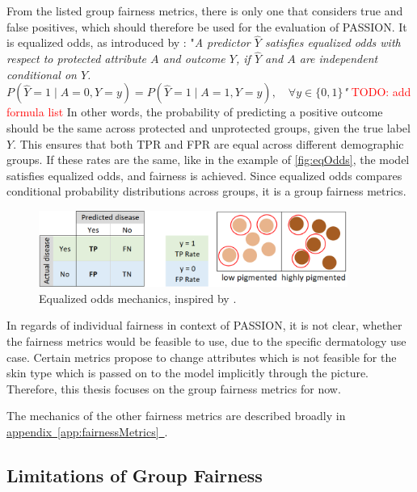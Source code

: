 \documentclass[12pt, a4paper, oneside]{book}   	%
\renewcommand{\todo}[1]{\textcolor{red}{TODO: #1}}
\newcommand{\linkapp}[1]{\hyperref[#1]{appendix~\ref{#1}~\nameref{#1}}}
\begin{document}
		From the listed group fairness metrics, there is only one that considers true and false positives, which should therefore be used for the evaluation of PASSION. It is equalized odds, as introduced by \textcite{M63_Hardt_2016}: \newline
		"\textit{A predictor $\hat{Y}$ satisfies equalized odds with respect to protected attribute $A$ and outcome $Y$, if $\hat{Y}$ and $A$ are independent conditional on $Y$. \newline
		\(
		P(\hat{Y} = 1 \mid A = 0, Y = y) = P(\hat{Y} = 1 \mid A = 1, Y = y), \quad \forall y \in \{0, 1\}
		\)"} \todo{add formula list} \newline
		In other words, the probability of predicting a positive outcome should be the same across protected and unprotected groups, given the true label $Y$. This ensures that both \gls{TPR} and \gls{FPR} are equal across different demographic groups. If these rates are the same, like in the example of \autoref{fig:eqOdds}, the model satisfies equalized odds, and fairness is achieved. Since equalized odds compares conditional probability distributions across groups, it is a group fairness metrics.
		
		\begin{figure}[H]
			\centering
			\includegraphics[width=0.9\textwidth]{figures/EqualizedOddsIllustration.png}
			\caption{Equalized odds mechanics, inspired by \autocite{M80_Kearns_2019}.}
			\label{fig:eqOdds}
		\end{figure}
		
		In regards of individual fairness in context of PASSION, it is not clear, whether the fairness metrics would be feasible to use, due to the specific dermatology use case. Certain metrics propose to change attributes which is not feasible for the skin type which is passed on to the model implicitly through the picture. Therefore, this thesis focuses on the group fairness metrics for now.
		
		The mechanics of the other fairness metrics are described broadly in \linkapp{app:fairnessMetrics}.
		
		\subsection{Limitations of Group Fairness}
		
\end{document}
